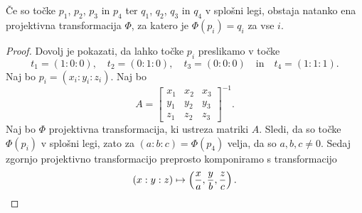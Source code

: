 \begin{lema}
Če so točke $p_1$, $p_2$, $p_3$ in $p_4$ ter $q_1$, $q_2$, $q_3$ in
$q_4$ v splošni legi, obstaja natanko ena projektivna
transformacija $\Phi$, za katero je $\Phi(p_i) = q_i$ za vse $i$.
\end{lema}

\begin{proof}
Dovolj je pokazati, da lahko točke $p_i$ preslikamo v točke
\[
t_1 = (1 : 0 : 0), \quad
t_2 = (0 : 1 : 0), \quad
t_3 = (0 : 0 : 0)
\quad \text{in} \quad
t_4 = (1 : 1 : 1).
\]
Naj bo $p_i = (x_i : y_i : z_i)$. Naj bo
\[
A =
\begin{bmatrix}
x_1 & x_2 & x_3 \\
y_1 & y_2 & y_3 \\
z_1 & z_2 & z_3
\end{bmatrix}^{-1}.
\]
Naj bo $\Phi$ projektivna transformacija, ki ustreza matriki $A$.
Sledi, da so točke $\Phi(p_i)$ v splošni legi, zato za
$(a : b : c) = \Phi(p_4)$ velja, da so $a, b, c \ne 0$. Sedaj
zgornjo projektivno transformacijo preprosto komponiramo s
transformacijo
\[
(x : y : z) \mapsto
\left(\frac{x}{a}, \frac{y}{b}, \frac{z}{c}\right). \qedhere
\]
\end{proof}
